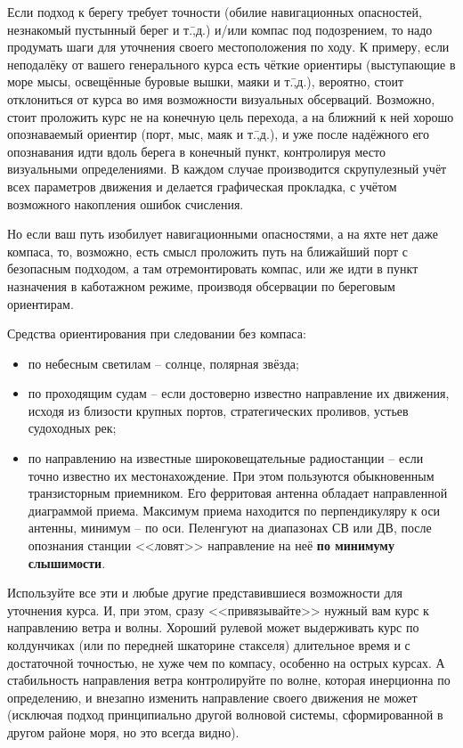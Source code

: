 \documentclass[a4paper, 12pt, twoside, final, book, russian, fittopage, cyremdash]{ncc}
\begin{document}
Если подход к берегу требует точности (обилие навигационных опасностей, незнакомый пустынный берег и т.\=,д.) и/или компас под подозрением, то надо продумать шаги для уточнения своего местоположения по ходу. К примеру, если неподалёку от вашего генерального курса есть чёткие ориентиры (выступающие в море мысы, освещённые буровые вышки, маяки и т.\=,д.), вероятно, стоит отклониться от курса во имя возможности визуальных обсерваций. Возможно, стоит проложить курс не на конечную цель перехода, а на ближний к ней хорошо опознаваемый ориентир (порт, мыс, маяк и т.\=,д.), и уже после надёжного его опознавания идти вдоль берега в конечный пункт, контролируя место визуальными определениями. В каждом случае производится скрупулезный учёт всех параметров движения и делается графическая прокладка, с учётом возможного накопления ошибок счисления. 

Но если ваш путь изобилует навигационными опасностями, а на яхте нет даже компаса, то, возможно, есть смысл проложить путь на ближайший порт с безопасным подходом, а там отремонтировать компас, или же идти в пункт назначения в каботажном режиме, производя обсервации по береговым ориентирам.

Средства ориентирования при следовании без компаса: 

\begin{itemize}
\item по небесным светилам \--- солнце, полярная звёзда; 
\item по проходящим судам \--- если достоверно известно направление их движения, исходя из близости крупных портов, стратегических проливов, устьев судоходных рек; 
\item по направлению на известные широковещательные радиостанции \--- если точно известно их местонахождение. При этом пользуются обыкновенным транзисторным приемником. Его ферритовая антенна обладает направленной диаграммой приема. Максимум приема находится по перпендикуляру к оси антенны, минимум \--- по оси. Пеленгуют на диапазонах СВ или ДВ, после опознания станции <<ловят>> направление на неё \textbf{по минимуму слышимости}.
\end{itemize} 

Используйте все эти и любые другие представившиеся возможности для уточнения курса. И, при этом, сразу <<привязывайте>> нужный вам курс к направлению ветра и волны. Хороший рулевой может выдерживать курс по колдунчиках (или по передней шкаторине стакселя) длительное время и с достаточной точностью, не хуже чем по компасу, особенно на острых курсах. А стабильность направления ветра контролируйте по волне, которая инерционна по определению, и внезапно изменить направление своего движения не может (исключая подход принципиально другой волновой системы, сформированной в другом районе моря, но это всегда видно).
\end{document}
